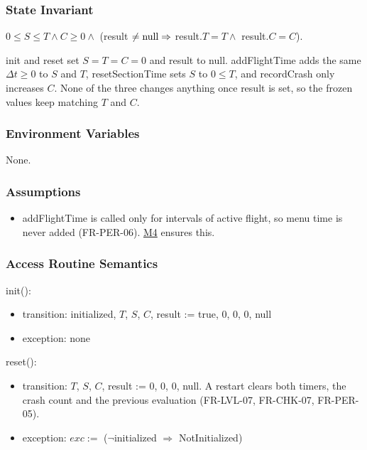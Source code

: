 \documentclass[12pt, titlepage]{article}
\newcommand{\True}{\textnormal{true}}
\newcommand{\nul}{\textnormal{null}}
\newcommand{\Mref}[1]{\hyperref[sec:M#1]{M#1}}
\newcommand{\noinit}{$\neg$initialized $\Rightarrow$ NotInitialized}
\begin{document}
\subsubsection{State Invariant}

$0 \leq S \leq T \wedge C \geq 0 \wedge$ (result $\neq \nul \Rightarrow$
result.$T = T \wedge$ result.$C = C$).

init and reset set $S = T = C = 0$ and result to \nul. addFlightTime adds the
same $\Delta t \geq 0$ to $S$ and $T$, resetSectionTime sets $S$ to $0 \leq
T$, and recordCrash only increases $C$. None of the three changes anything once
result is set, so the frozen values keep matching $T$ and $C$.

\subsubsection{Environment Variables}

None.

\subsubsection{Assumptions}

\begin{itemize}
\item addFlightTime is called only for intervals of active flight, so menu
  time is never added (FR-PER-06). \Mref{4} ensures this.
\end{itemize}

\subsubsection{Access Routine Semantics}

\noindent init():
\begin{itemize}
\item transition: initialized, $T$, $S$, $C$, result := \True, 0, 0, 0, \nul
\item exception: none
\end{itemize}

\noindent reset():
\begin{itemize}
\item transition: $T$, $S$, $C$, result := 0, 0, 0, \nul. A restart clears
  both timers, the crash count and the previous evaluation (FR-LVL-07,
  FR-CHK-07, FR-PER-05).
\item exception: $exc :=$ (\noinit)
\end{itemize}
\end{document}
